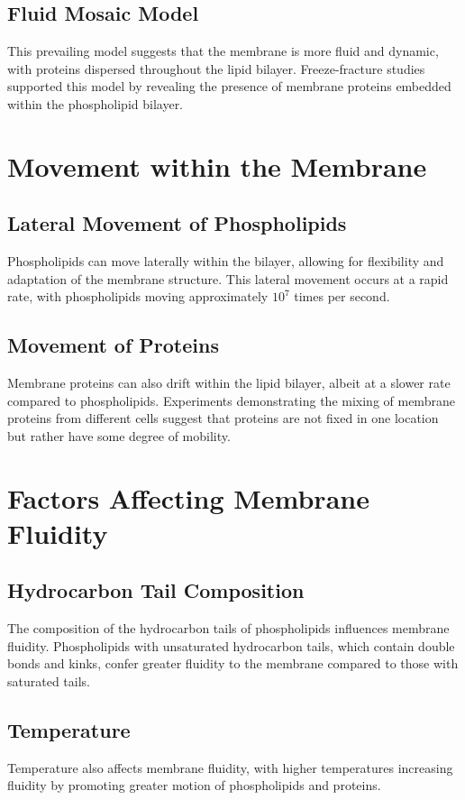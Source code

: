 \documentclass{article}
\begin{document}
\subsection{Fluid Mosaic Model}
This prevailing model suggests that the membrane is more fluid and dynamic, with proteins dispersed throughout the lipid bilayer. Freeze-fracture studies supported this model by revealing the presence of membrane proteins embedded within the phospholipid bilayer.

\section{Movement within the Membrane}

\subsection{Lateral Movement of Phospholipids}
Phospholipids can move laterally within the bilayer, allowing for flexibility and adaptation of the membrane structure. This lateral movement occurs at a rapid rate, with phospholipids moving approximately $10^7$ times per second.

\subsection{Movement of Proteins}
Membrane proteins can also drift within the lipid bilayer, albeit at a slower rate compared to phospholipids. Experiments demonstrating the mixing of membrane proteins from different cells suggest that proteins are not fixed in one location but rather have some degree of mobility.

\section{Factors Affecting Membrane Fluidity}

\subsection{Hydrocarbon Tail Composition}
The composition of the hydrocarbon tails of phospholipids influences membrane fluidity. Phospholipids with unsaturated hydrocarbon tails, which contain double bonds and kinks, confer greater fluidity to the membrane compared to those with saturated tails.

\subsection{Temperature}
Temperature also affects membrane fluidity, with higher temperatures increasing fluidity by promoting greater motion of phospholipids and proteins.
\end{document}
